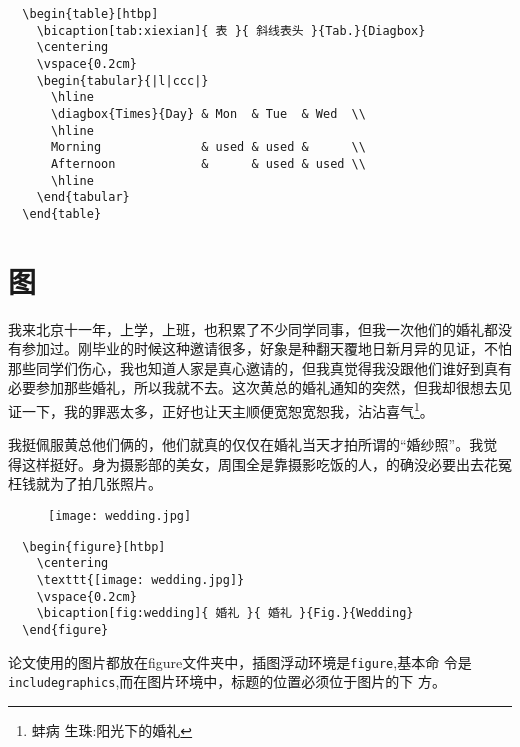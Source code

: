\begin{lstlisting}
  \begin{table}[htbp]
    \bicaption[tab:xiexian]{ 表 }{ 斜线表头 }{Tab.}{Diagbox}
    \centering
    \vspace{0.2cm}
    \begin{tabular}{|l|ccc|}
      \hline
      \diagbox{Times}{Day} & Mon  & Tue  & Wed  \\
      \hline
      Morning              & used & used &      \\
      Afternoon            &      & used & used \\
      \hline
    \end{tabular}
  \end{table}
\end{lstlisting}


\section{图}
\label{chap02:figure}

我来北京十一年，上学，上班，也积累了不少同学同事，但我一次他们的婚礼都没
有参加过。刚毕业的时候这种邀请很多，好象是种翻天覆地日新月异的见证，不怕
那些同学们伤心，我也知道人家是真心邀请的，但我真觉得我没跟他们谁好到真有
必要参加那些婚礼，所以我就不去。这次黄总的婚礼通知的突然，但我却很想去见
证一下，我的罪恶太多，正好也让天主顺便宽恕宽恕我，沾沾喜气\footnote{蚌病
  生珠:阳光下的婚礼}。

我挺佩服黄总他们俩的，他们就真的仅仅在婚礼当天才拍所谓的“婚纱照”。我觉
得这样挺好。身为摄影部的美女，周围全是靠摄影吃饭的人，的确没必要出去花冤
枉钱就为了拍几张照片。

\begin{figure}[htbp]
  \centering
  \texttt{[image: wedding.jpg]}
  \vspace{0.2cm}
\end{figure}

\begin{lstlisting}
  \begin{figure}[htbp]
    \centering
    \texttt{[image: wedding.jpg]}
    \vspace{0.2cm}
    \bicaption[fig:wedding]{ 婚礼 }{ 婚礼 }{Fig.}{Wedding}
  \end{figure}
\end{lstlisting}

论文使用的图片都放在figure文件夹中，插图浮动环境是\texttt{figure},基本命
令是\texttt{includegraphics},而在图片环境中，标题的位置必须位于图片的下
方。

